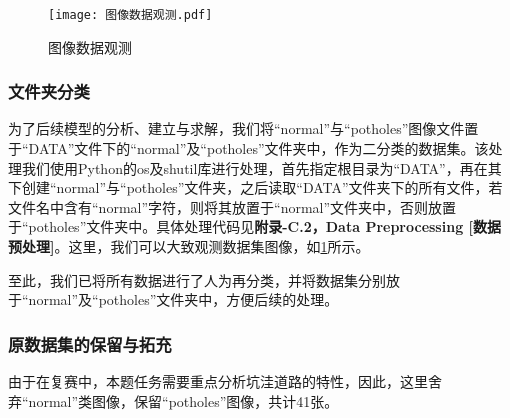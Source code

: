 \documentclass{MathorCupmodeling}
\begin{document}
\begin{table}[H]
	\centering
	\caption{异常标注图片的处理}
	\label{tab:异常图片处理}
\end{table}

\begin{figure}[H]
	\centering
	\texttt{[image: 图像数据观测.pdf]}
	\caption{图像数据观测}
	\label{fig:图像数据观测}
\end{figure}
	\subsubsection{文件夹分类}
	为了后续模型的分析、建立与求解，我们将“normal”与“potholes”图像文件置于“DATA”文件下的“normal”及“potholes”文件夹中，作为二分类的数据集。该处理我们使用Python的os及shutil库进行处理，首先指定根目录为“DATA”，再在其下创建“normal”与“potholes”文件夹，之后读取“DATA”文件夹下的所有文件，若文件名中含有“normal”字符，则将其放置于“normal”文件夹中，否则放置于“potholes”文件夹中。具体处理代码见\textbf{附录-C.2，Data Preprocessing [数据预处理]}。这里，我们可以大致观测数据集图像，如\textcolor{blue}{\cref{fig:图像数据观测}}所示。

	至此，我们已将所有数据进行了人为再分类，并将数据集分别放于“normal”及“potholes”文件夹中，方便后续的处理。
	
	\subsubsection{原数据集的保留与拓充}
	由于在复赛中，本题任务需要重点分析坑洼道路的特性，因此，这里舍弃“normal”类图像，保留“potholes”图像，共计41张。
\end{document}

